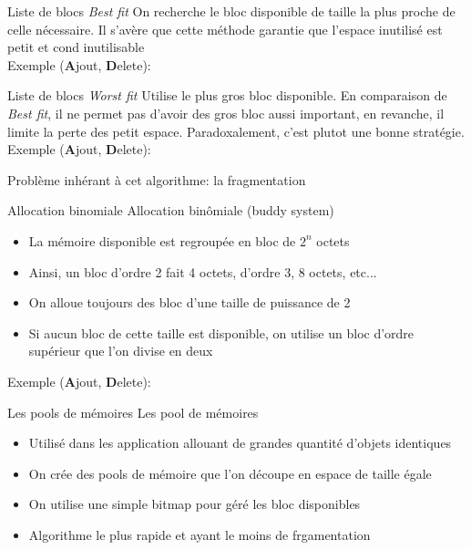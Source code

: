 \begin{frame}{Liste de blocs}
  \emph{Best fit}  On recherche le  bloc disponible de taille  la plus
  proche de  celle nécessaire.  Il s'avère que  cette méthode garantie
  que l'espace inutilisé est petit et cond inutilisable
  \\
  Exemple (\textbf{A}jout, \textbf{D}elete):
  \begin{center}
  \end{center}
\end{frame}

\begin{frame}{Liste de blocs}
  \emph{Worst  fit}   Utilise  le   plus  gros  bloc   disponible.  En
  comparaison de  \emph{Best fit}, il  ne permet pas d'avoir  des gros
  bloc  aussi important,  en revanche,  il limite  la perte  des petit
  espace.  Paradoxalement, c'est plutot une bonne stratégie.
  \\
  Exemple (\textbf{A}jout, \textbf{D}elete):
  \begin{center}
  \end{center}
   Problème inhérant à cet algorithme: la fragmentation
\end{frame}

\begin{frame}[fragile=singleslide]{Allocation binomiale}
  Allocation binômiale (buddy system)
  \begin{itemize}
  \item La mémoire disponible est regroupée en bloc de $2^n$ octets
  \item Ainsi, un  bloc d'ordre 2 fait 4 octets,  d'ordre 3, 8 octets,
    etc...
  \item On alloue toujours des bloc d'une taille de puissance de 2
  \item Si  aucun bloc de cette  taille est disponible,  on utilise un
    bloc d'ordre supérieur que l'on divise en deux
  \end{itemize}
  Exemple (\textbf{A}jout, \textbf{D}elete):
  \begin{center}
  \end{center}
\end{frame}

\begin{frame}[fragile=singleslide]{Les pools de mémoires}
  Les pool de mémoires
  \begin{itemize}
  \item  Utilisé dans  les  application allouant  de grandes  quantité
    d'objets identiques
  \item On  crée des pools  de mémoire que  l'on découpe en  espace de
    taille égale
  \item On utilise une simple bitmap pour géré les bloc disponibles
  \item Algorithme le plus rapide et ayant le moins de frgamentation
  \end{itemize}
\end{frame}

